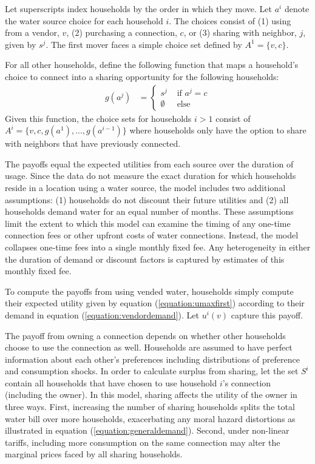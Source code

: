 \documentclass[12pt]{article}
\begin{document}
Let superscripts index households by the order in which they move.  Let $a^{i}$ denote the water source choice for each household $i$.  The choices consist of (1) using from a vendor, $v$, (2) purchasing a connection, $c$, or (3) sharing with neighbor, $j$, given by $s^{j}$.  The first mover faces a simple choice set defined by $A^{1} = \{  v, c  \}$.

For all other households, define the following function that maps a household's choice to connect into a sharing opportunity for the following households:
\begin{align*}
g( a^{j} ) &=
\begin{cases}
s^j        &  \text{ if } a^{j} = c \\
\emptyset  &  \text{ else } 
\end{cases}
\end{align*}
Given this function, the choice sets for households $i>1$ consist of $A^{i} = \{ v,c,g(a^{1}),...,g(a^{i-1}) \} $ where households only have the option to share with neighbors that have previously connected.  

The payoffs equal the expected utilities from each source over the duration of usage.  Since the data do not measure the exact duration for which households reside in a location using a water source, the model includes two additional assumptions: (1) households do not discount their future utilities and (2) all households demand water for an equal number of months.  These assumptions limit the extent to which this model can examine the timing of any one-time connection fees or other upfront costs of water connections.  Instead, the model collapses one-time fees into a single monthly fixed fee.  Any heterogeneity in either the duration of demand or discount factors is captured by estimates of this monthly fixed fee.  

To compute the payoffs from using vended water, households simply compute their expected utility given by equation (\ref{equation:umaxfirst}) according to their demand in equation (\ref{equation:vendordemand}).  Let $u^{i}(v)$ capture this payoff.

The payoff from owning a connection depends on whether other households choose to use the connection as well.  Households are assumed to have perfect information about each other's preferences including distributions of preference and consumption shocks.  In order to calculate surplus from sharing, let the set $S^{i}$ contain all households that have chosen to use household $i$'s connection (including the owner).  In this model, sharing affects the utility of the owner in three ways.  First, increasing the number of sharing households splits the total water bill over more households, exacerbating any moral hazard distortions as illustrated in equation (\ref{equation:generaldemand}).  Second, under non-linear tariffs, including more consumption on the same connection may alter the marginal prices faced by all sharing households.  
\end{document}
